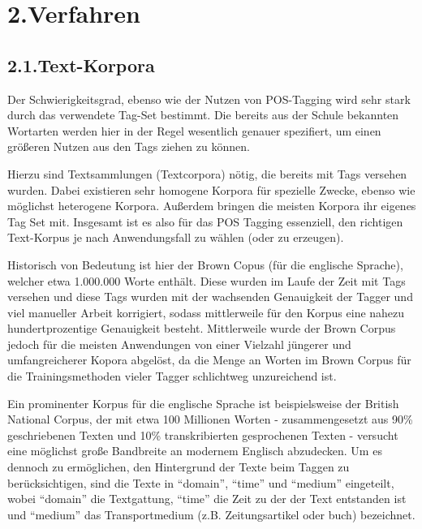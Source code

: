 \documentclass{article}
\begin{document}
\section{2.\hspace*{0.5em}Verfahren}\label{sec-verfahren}%

\subsection{2.1.\hspace*{0.5em}Text-Korpora}\label{sec-text-korpora}%

\noindent{}Der Schwierigkeitsgrad, ebenso wie der Nutzen von POS-Tagging wird sehr stark durch das verwendete Tag-Set bestimmt. Die bereits aus der Schule bekannten Wortarten werden hier in der Regel wesentlich genauer spezifiert, um einen größeren Nutzen aus den Tags ziehen zu können.%

Hierzu sind Textsammlungen (Textcorpora) nötig, die bereits mit Tags versehen wurden.
Dabei existieren sehr homogene Korpora für spezielle Zwecke, ebenso wie möglichst heterogene Korpora. Außerdem bringen die meisten Korpora ihr eigenes Tag Set mit. Insgesamt ist es also für das POS Tagging essenziell, den richtigen Text-Korpus je nach Anwendungsfall zu wählen (oder zu erzeugen).%

Historisch von Bedeutung ist hier der Brown Copus (für die englische Sprache), welcher etwa 1.000.000 Worte enthält. Diese wurden im Laufe der Zeit mit Tags versehen und diese Tags wurden mit der wachsenden Genauigkeit der Tagger und viel manueller Arbeit korrigiert, sodass mittlerweile für den Korpus eine nahezu hundertprozentige Genauigkeit besteht.
Mittlerweile wurde der Brown Corpus jedoch für die meisten Anwendungen von einer Vielzahl jüngerer und umfangreicherer Kopora abgelöst, da die Menge an Worten im Brown Corpus für die Trainingsmethoden vieler Tagger schlichtweg unzureichend ist.%

Ein prominenter Korpus für die englische Sprache ist beispielsweise der British National Corpus, der mit etwa 100 Millionen Worten - zusammengesetzt aus 90\% geschriebenen Texten und 10\% transkribierten gesprochenen Texten - versucht eine möglichst große Bandbreite an modernem Englisch abzudecken. Um es dennoch zu ermöglichen, den Hintergrund der Texte beim Taggen zu berücksichtigen, sind die Texte in \textquotedblleft{}domain\textquotedblright{}, \textquotedblleft{}time\textquotedblright{} und \textquotedblleft{}medium\textquotedblright{} eingeteilt, wobei \textquotedblleft{}domain\textquotedblright{} die Textgattung, \textquotedblleft{}time\textquotedblright{} die Zeit zu der der Text entstanden ist und \textquotedblleft{}medium\textquotedblright{} das Transportmedium (z.B. Zeitungsartikel oder buch) bezeichnet.%
\end{document}
